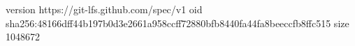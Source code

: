 version https://git-lfs.github.com/spec/v1
oid sha256:48166dff44b197b0d3e2661a958ccff72880bfb8440fa44fa8beeccfb8ffc515
size 1048672
